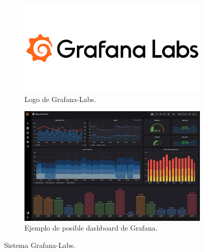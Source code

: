 \documentclass[11pt,a4paper,twoside]{report}
\begin{document}
\begin{figure}[hbtp]
	\centering
	\begin{subfigure}[b]{0.48\textwidth}
		\centering
		\includegraphics[width=\textwidth]{documento/16.png}
		\caption{Logo de Grafana-Labs.}
		\label{fig:grafana-logo}
	\end{subfigure}
	\hfill
	\begin{subfigure}[b]{0.48\textwidth}
		\centering
		\includegraphics[width=\textwidth]{documento/17.png}
		\caption{Ejemplo de posible dashboard de Grafana.}
		\label{fig:ejemplo-grafana}
	\end{subfigure}
	\caption{Sistema Grafana-Labs.} %
	\label{fig:grafana-labs}
\end{figure}
\end{document}
